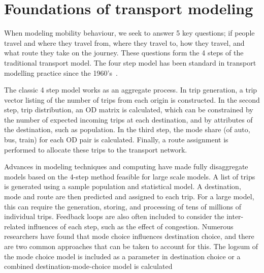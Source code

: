 \section{Foundations of transport modeling}
When modeling mobility behaviour, we seek to answer 5 key questions; if people travel and where they travel from, where they travel to, how they travel, and what route they take on the journey. These questions form the 4 steps of the traditional transport model. The four step model has been standard in transport modelling practice since the 1960's~\parencite{de1994modelling}. 

The classic 4 step model works as an aggregate process. In trip generation, a trip vector listing of the number of trips from each origin is constructed. In the second step, trip distribution, an OD matrix is calculated, which can be constrained by the number of expected incoming trips at each destination, and by attributes of the destination, such as population. In the third step, the mode share (of auto, bus, train) for each OD pair is calculated. Finally, a route assignment is performed to allocate these trips to the transport network. 

Advances in modeling techniques and computing have made fully disaggregate models based on the 4-step method feasible for large scale models. A list of trips is generated using a sample population and statistical model. A destination, mode and route are then predicted and assigned to each trip. For a large model, this can require the generation, storing, and processing of tens of millions of individual trips. Feedback loops are also often included to consider the inter-related influences of each step, such as the effect of congestion. Numerous researchers have found that mode choice influences destination choice, and there are two common approaches that can be taken to account for this. The logsum of the mode choice model is included as a parameter in destination choice \parencite{jonnalagadda2001development, mishra2011functional} or a combined destination-mode-choice model is calculated \parencite{newman2010hierarchical, adler1976joint, boyce1983implementation, Outwater15}

